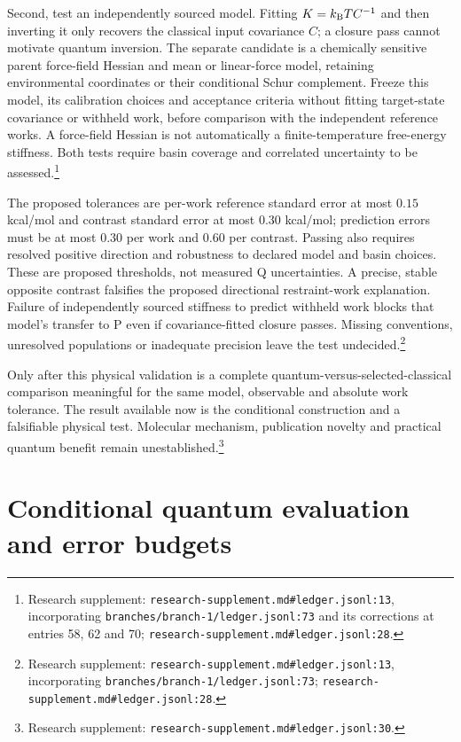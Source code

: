 \documentclass{article}
\begin{document}
Second, test an independently sourced model. Fitting \(K=k_{\rm B}T C^{-1}\) and then inverting it only recovers the classical input covariance \(C\); a closure pass cannot motivate quantum inversion. The separate candidate is a chemically sensitive parent force-field Hessian and mean or linear-force model, retaining environmental coordinates or their conditional Schur complement. Freeze this model, its calibration choices and acceptance criteria without fitting target-state covariance or withheld work, before comparison with the independent reference works. A force-field Hessian is not automatically a finite-temperature free-energy stiffness. Both tests require basin coverage and correlated uncertainty to be assessed.\footnote{Research supplement: \nolinkurl{research-supplement.md\#ledger.jsonl:13}, incorporating \nolinkurl{branches/branch-1/ledger.jsonl:73} and its corrections at entries 58, 62 and 70; \nolinkurl{research-supplement.md\#ledger.jsonl:28}.}

The proposed tolerances are per-work reference standard error at most \(0.15\) kcal/mol and contrast standard error at most \(0.30\) kcal/mol; prediction errors must be at most \(0.30\) per work and \(0.60\) per contrast. Passing also requires resolved positive direction and robustness to declared model and basin choices. These are proposed thresholds, not measured Q uncertainties. A precise, stable opposite contrast falsifies the proposed directional restraint-work explanation. Failure of independently sourced stiffness to predict withheld work blocks that model's transfer to P even if covariance-fitted closure passes. Missing conventions, unresolved populations or inadequate precision leave the test undecided.\footnote{Research supplement: \nolinkurl{research-supplement.md\#ledger.jsonl:13}, incorporating \nolinkurl{branches/branch-1/ledger.jsonl:73}; \nolinkurl{research-supplement.md\#ledger.jsonl:28}.}

Only after this physical validation is a complete quantum-versus-selected-classical comparison meaningful for the same model, observable and absolute work tolerance. The result available now is the conditional construction and a falsifiable physical test. Molecular mechanism, publication novelty and practical quantum benefit remain unestablished.\footnote{Research supplement: \nolinkurl{research-supplement.md\#ledger.jsonl:30}.}

\appendix
\section{Conditional quantum evaluation and error budgets}\label{app:quantum}
\end{document}
